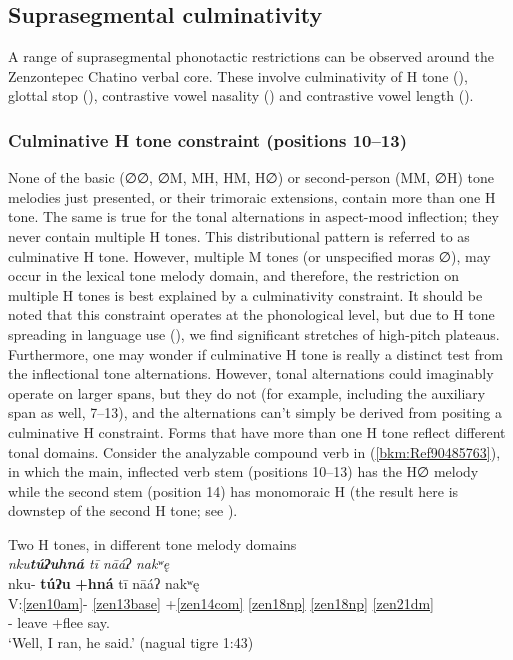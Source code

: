 \documentclass[output=paper]{langscibook}
\begin{document}
\subsection{Suprasegmental culminativity}
\label{bkm:Ref90474927}
A range of suprasegmental phonotactic restrictions can be observed around the Zenzontepec Chatino verbal core. These involve culminativity of H tone (), glottal stop (), contrastive vowel nasality () and contrastive vowel length ().

\subsubsection{Culminative H tone constraint (positions 10{}--13)}
\label{bkm:Ref113308111}
None of the basic (∅∅, ∅M, MH, HM, H∅) or second-person (MM, ∅H) tone melodies just presented, or their trimoraic extensions, contain more than one H tone. The same is true for the tonal alternations in aspect-mood inflection; they never contain multiple H tones. This distributional pattern is referred to as culminative H tone. However, multiple M tones (or unspecified moras ∅), may occur in the lexical tone melody domain, and therefore, the restriction on multiple H tones is best explained by a culminativity constraint. It should be noted that this constraint operates at the phonological level, but due to H tone spreading in language use (), we find significant stretches of high-pitch plateaus. Furthermore, one may wonder if culminative H tone is really a distinct test from the inflectional tone alternations. However, tonal alternations could imaginably operate on larger spans, but they do not (for example, including the auxiliary span as well, 7{}--13), and the alternations can't simply be derived from positing a culminative H constraint. Forms that have more than one H tone reflect different tonal domains. Consider the analyzable compound verb in (\ref{bkm:Ref90485763}), in which the main, inflected verb stem (positions 10{}--13) has the H∅ melody while the second stem (position 14) has monomoraic H (the result here is downstep of the second H tone; see ).


\ea\label{bkm:Ref90485763}Two H tones, in different tone melody domains\\
\textit{nku\textbf{túʔuhná} tī nāáʔ nakʷę}\\
\glll nku- \textbf{túʔu} \textbf{+hná} tī nāáʔ nakʷę\\
V:\ref{zen10am}{}- \ref{zen13base} +\ref{zen14com} \ref{zen18np} \ref{zen18np} \ref{zen21dm} \\ 
\Pfv{}- leave +flee \Tplz{} \First\Sg{} say.\Third{}\\
\glt `Well, I ran, he said.' (nagual tigre 1:43)
\z
\end{document}
